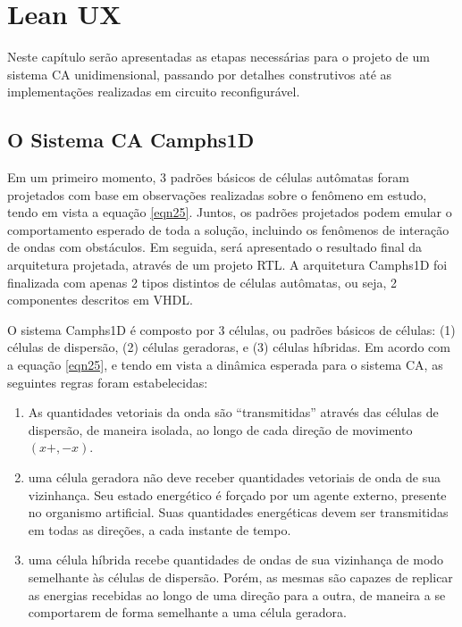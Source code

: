 \chapter[Lean UX]{Lean UX}

Neste capítulo serão apresentadas as etapas necessárias para o projeto de um sistema CA unidimensional, passando por detalhes construtivos até as implementações realizadas em circuito reconfigurável.

\section{O Sistema CA Camphs1D}

Em um primeiro momento, 3 padrões básicos de células autômatas foram projetados com base em observações realizadas sobre o fenômeno em estudo, tendo em vista a equação \ref{eqn25}. Juntos, os padrões projetados podem emular o comportamento esperado de toda a solução, incluindo os fenômenos de interação de ondas com obstáculos. Em seguida, será apresentado o resultado final da arquitetura projetada, através de um projeto RTL. A arquitetura Camphs1D foi finalizada com apenas 2 tipos distintos de células autômatas, ou seja, 2 componentes descritos em VHDL. 

O sistema Camphs1D é composto por 3 células, ou padrões básicos de células: (1) células de dispersão, (2) células geradoras, e (3) células híbridas. Em acordo com a equação \ref{eqn25}, e tendo em vista a dinâmica esperada para o sistema CA, as seguintes regras foram estabelecidas:

\begin{enumerate}
	\item As quantidades vetoriais da onda são ``transmitidas'' através das células de dispersão, de maneira isolada, ao longo de cada direção de movimento $(x+,-x)$.
	\item uma célula geradora não deve receber quantidades vetoriais de onda de sua vizinhança. Seu estado energético é forçado por um agente externo, presente no organismo artificial. Suas quantidades energéticas devem ser transmitidas em todas as direções, a cada instante de tempo. 
	\item uma célula híbrida recebe quantidades de ondas de sua vizinhança de modo semelhante às células de dispersão. Porém, as mesmas são capazes de replicar as energias recebidas ao longo de uma direção para a outra, de maneira a se comportarem de forma semelhante a uma célula geradora.
\end{enumerate}

